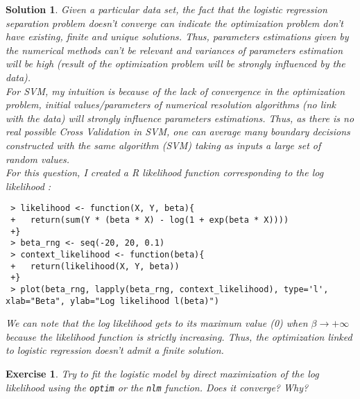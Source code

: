 \documentclass[12pt,a4paper]{article}
\newtheorem{exercise}{Exercise}
\newtheorem{solution}{Solution}
\begin{document}
\begin{solution}
Given a particular data set, the fact that the logistic regression separation problem doesn't converge can indicate the optimization problem don't have existing, finite and unique solutions. Thus, parameters estimations given by the numerical methods can't be relevant and variances of parameters estimation will be high (result of the optimization problem will be strongly influenced by the data).\\

For SVM, my intuition is because of the lack of convergence in the optimization problem, initial values/parameters of numerical resolution algorithms (no link with the data) will strongly influence parameters estimations. Thus, as there is no real possible Cross Validation in SVM, one can average many boundary decisions constructed with the same algorithm (SVM) taking as inputs a large set of random values.\\

For this question, I created a R likelihood function corresponding to the log likelihood :\\
\begin{verbatim}
 > likelihood <- function(X, Y, beta){
 +   return(sum(Y * (beta * X) - log(1 + exp(beta * X))))
 +}
 > beta_rng <- seq(-20, 20, 0.1) 
 > context_likelihood <- function(beta){
 +   return(likelihood(X, Y, beta))
 +} 
 > plot(beta_rng, lapply(beta_rng, context_likelihood), type='l', xlab="Beta", ylab="Log likelihood l(beta)") 
\end{verbatim}

We can note that the log likelihood gets to its maximum value (0)  when $\beta \rightarrow +\infty$ because the likelihood function is strictly increasing. Thus, the optimization linked to logistic regression doesn't admit a finite solution. 
\end{solution}

\begin{exercise}
Try to fit the logistic model by direct maximization of the log likelihood using the \texttt{optim} or the \texttt{nlm} function. 
Does it converge? Why?
\end{exercise}
\end{document}

